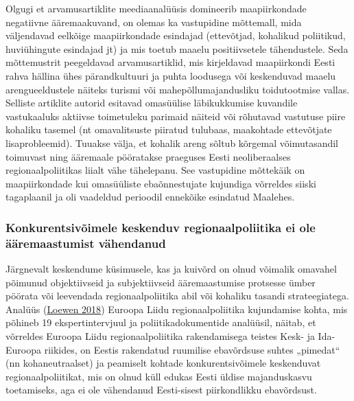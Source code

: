 \documentclass[estonian,]{article}
\begin{document}
Olgugi et arvamusartiklite meediaanalüüsis domineerib maapiirkondade negatiivne ääremaakuvand, on olemas ka vastupidine mõttemall, mida väljendavad eelkõige maapiirkondade esindajad (ettevõtjad, kohalikud poliitikud, huviühingute esindajad jt) ja mis toetub maaelu positiivsetele tähendustele. Seda mõttemustrit peegeldavad arvamusartiklid, mis kirjeldavad maapiirkondi Eesti rahva hällina ühes pärandkultuuri ja puhta loodusega või keskenduvad maaelu arengueeldustele näiteks turismi või mahepõllumajandusliku toidutootmise vallas. Selliste artiklite autorid esitavad omasüülise läbikukkumise kuvandile vastukaaluks aktiivse toimetuleku parimaid näiteid või rõhutavad vastutuse piire kohaliku tasemel (nt omavalitsuste piiratud tulubaas, maakohtade ettevõtjate lisaprobleemid). Tuuakse välja, et kohalik areng sõltub kõrgemal võimutasandil toimuvast ning ääremaale pööratakse praeguses Eesti neoliberaalses regionaalpoliitikas liialt vähe tähelepanu. See vastupidine mõttekäik on maapiirkondade kui omasüüliste ebaõnnestujate kujundiga võrreldes siiski tagaplaanil ja oli vaadeldud perioodil ennekõike esindatud Maalehes.

\hypertarget{konkurentsivuxf5imele-keskenduv-regionaalpoliitika-ei-ole-uxe4uxe4remaastumist-vuxe4hendanud}{%
\subsubsection*{Konkurentsivõimele keskenduv regionaalpoliitika ei ole ääremaastumist vähendanud}\label{konkurentsivuxf5imele-keskenduv-regionaalpoliitika-ei-ole-uxe4uxe4remaastumist-vuxe4hendanud}}

Järgnevalt keskendume küsimusele, kas ja kuivõrd on olnud võimalik omavahel põimunud objektiivseid ja subjektiivseid ääremaastumise protsesse ümber pöörata või leevendada regionaalpoliitika abil või kohaliku tasandi strateegiatega. Analüüs (\protect\hyperlink{Loewen2018}{Loewen 2018}) Euroopa Liidu regionaalpoliitika kujundamise kohta, mis põhineb 19 ekspertintervjuul ja poliitikadokumentide analüüsil, näitab, et võrreldes Euroopa Liidu regionaalpoliitika rakendamisega teistes Kesk- ja Ida-Euroopa riikides, on Eestis rakendatud ruumilise ebavõrdsuse suhtes „pimedat`` (nn kohaneutraalset) ja peamiselt kohtade konkurentsivõimele keskenduvat regionaalpoliitikat, mis on olnud küll edukas Eesti üldise majanduskasvu toetamiseks, aga ei ole vähendanud Eesti-sisest piirkondlikku ebavõrdsust.
\end{document}
